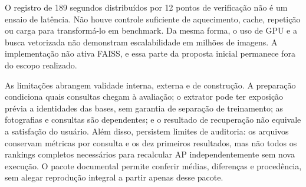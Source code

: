 O registro de 189 segundos distribuídos por 12 pontos de verificação não é um ensaio de latência. Não houve controle suficiente de aquecimento, cache, repetição ou carga para transformá-lo em benchmark. Da mesma forma, o uso de GPU e a busca vetorizada não demonstram escalabilidade em milhões de imagens. A implementação não ativa FAISS, e essa parte da proposta inicial permanece fora do escopo realizado.

As limitações abrangem validade interna, externa e de construção. A preparação condiciona quais consultas chegam à avaliação; o extrator pode ter exposição prévia a identidades das bases, sem garantia de separação de treinamento; as fotografias e consultas são dependentes; e o resultado de recuperação não equivale a satisfação do usuário. Além disso, persistem limites de auditoria: os arquivos conservam métricas por consulta e os dez primeiros resultados, mas não todos os rankings completos necessários para recalcular AP independentemente sem nova execução. O pacote documental permite conferir médias, diferenças e procedência, sem alegar reprodução integral a partir apenas desse pacote.

